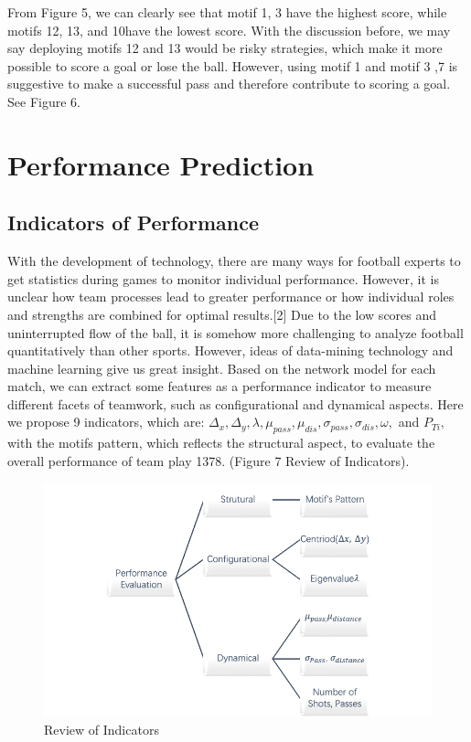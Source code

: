 \documentclass{mcmthesis}
\begin{document}
 From Figure 5, we can clearly see that motif 1, 3 have the highest score, while motifs 12, 13, and 10have the lowest score. With the discussion before, we may say deploying motifs 12 and 13 would be risky strategies, which make it more possible to score a goal or lose the ball. However, using motif 1 and motif 3 ,7 is suggestive to make a successful pass and therefore contribute to scoring a goal. See Figure 6.
 


\newpage

\section{Performance Prediction}
\subsection {Indicators of Performance}

With the development of technology, there are many ways for football experts to get statistics during games to monitor individual performance. However, it is unclear how team processes lead to greater performance or how individual roles and strengths are combined for optimal results.[2] Due to the low scores and uninterrupted flow of the ball, it is somehow more challenging to analyze football quantitatively than other sports. However, ideas of data-mining technology and machine learning give us great insight. Based on the network model for each match, we can extract some features as a performance indicator to measure different facets of teamwork, such as configurational and dynamical aspects.  Here we propose 9 indicators, which are: $\Delta_x, \Delta_y,\lambda,\mu_{pass},\mu_{dis},\sigma_{pass},\sigma_{dis},\omega,$ and $P_{Ti},$ with the motifs pattern, which reflects the structural aspect, to evaluate the overall performance of team play 1378. (Figure 7 Review of Indicators).

\begin{figure}[h!]
\begin{center}
\includegraphics[width=.6\textwidth]{F7.png}
\caption{Review of Indicators}
\end{center}
\end{figure}
\end{document}
